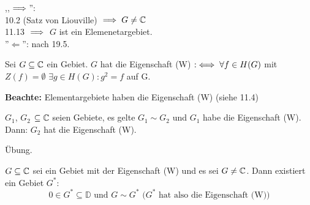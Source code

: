 \documentclass[a4paper,twoside,DIV15,BCOR12mm]{scrbook}
\begin{document}
\begin{beweis}
  ,,$\implies$'':  \\
  10.2 (Satz von Liouville) $\implies G\ne\mathbb{C}$\\
  11.13 $\implies$ $G$ ist ein Elemenetargebiet.\\
  ''$\Longleftarrow$'': nach 19.5. \\
\end{beweis}
\begin{definition}
  Sei $G\subseteq\mathbb{C}$ ein Gebiet. $G$ hat die Eigenschaft (W) $:\iff \forall f\in H(G)$ mit $Z(f) = \emptyset$ $\exists g\in H(G): g^2 = f$ auf G.
\end{definition}
\textbf{Beachte:} Elementargebiete haben die Eigenschaft (W) (siehe 11.4)

\begin{lemma}
  $G_1$, $G_2$ $\subseteq \mathbb{C}$ seien Gebiete, es gelte $G_1\sim G_2$ und $G_1$ habe die Eigenschaft (W). 
  Dann: $G_2$ hat die Eigenschaft (W).
\end{lemma}
\begin{beweis}
  \"Ubung.
\end{beweis}
\begin{lemma}
  $G\subseteq\mathbb{C}$ sei ein Gebiet mit der Eigenschaft (W) und es sei $G\ne\mathbb{C}$. Dann existiert ein Gebiet $G^*$:\\
  $$ 0\in G^*\subseteq \mathbb{D} \text{ und } G \sim G^* \text{ ($G^*$ hat also die Eigenschaft (W))}$$
\end{lemma}
\end{document}
